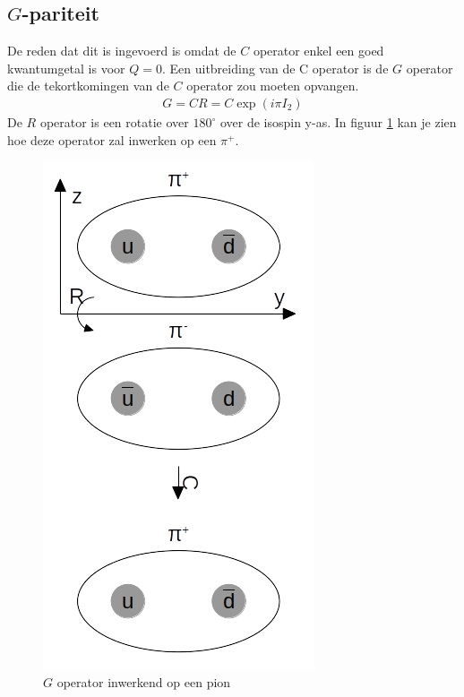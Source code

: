 \documentclass[../main.tex]{subfiles}
\begin{document}
\subsection{$G$-pariteit}%
\label{sub:g_pariteit}

De reden dat dit is ingevoerd is omdat de $C$ operator enkel een goed kwantumgetal is voor $Q=0$. Een uitbreiding van de C operator is de $G$ operator die de tekortkomingen van de $C$ operator zou moeten opvangen.
\begin{equation}
    \begin{aligned}
        \label{eq:g_operator}
        G=CR=C\exp(i\pi I_2)
    \end{aligned}
\end{equation}
De $R$ operator is een rotatie over $180^\circ$ over de isospin y-as. In figuur \ref{fig:pi_g_operator} kan je zien hoe deze operator zal inwerken op een $\pi^+$.

\begin{figure}[h]
    \centering
    \includegraphics[width=0.4\linewidth]{quantum_numbers/pi_g_operator.jpg}
    \caption{$G$ operator inwerkend op een pion}%
    \label{fig:pi_g_operator}
\end{figure}
\end{document}
